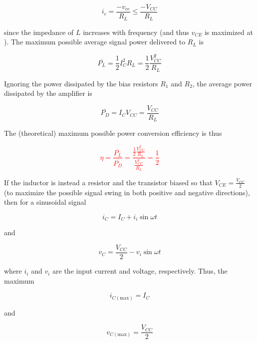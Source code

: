 \begin{equation}
i_{c} = \frac{-v_{ce}}{R_{L}} \leq \frac{-V_{CC}}{R_{L}}
\end{equation}

since the impedance of $L$ increases with frequency (and thus $v_{CE}$ is maximized at \DC).
The maximum possible average signal power delivered to $R_{L}$ is

\begin{equation}
\overline{P_{L}} = \frac{1}{2}I_{C}^{2}R_{L} = \frac{1}{2}\frac{V_{CC}^{2}}{R_{L}}
\end{equation}

Ignoring the power dissipated by the bias resistors $R_1$ and $R_2$, the average power dissipated by the amplifier is

\begin{equation}
\overline{P_{D}} = I_{C}V_{CC} = \frac{V_{CC}}{R_{L}}
\end{equation}

The (theoretical) maximum possible power conversion efficiency is thus \autocite[588-589]{microelectronics-neaman}

\textcolor{red}{
\begin{equation}
\eta = \frac{\overline{P_{L}}}{\overline{P_{D}}} = \frac{\frac{1}{2}\frac{V_{CC}^{2}}{R_{L}}}{\frac{V_{CC}^{2}}{R_{L}}} = \frac{1}{2}
\end{equation}
}

If the inductor is instead a resistor and the transistor biased so that $V_{CE} = \frac{V_{CC}}{2}$ (to maximize the possible signal swing in both positive and negative directions), then for a sinusoidal signal

\begin{equation}
i_{C} = I_{C} + i_{i}\sin{\omega t}
\end{equation}

and

\begin{equation}
v_{C} = \frac{V_{CC}}{2} - v_{i}\sin{\omega t}
\end{equation}

where $i_{i}$ and $v_{i}$ are the input current and voltage, respectively.
Thus, the maximum

\begin{equation}
i_{C(\text{max})} = I_{C}
\end{equation}

and

\begin{equation}
v_{C(\text{max})} = \frac{V_{CC}}{2}
\end{equation}

